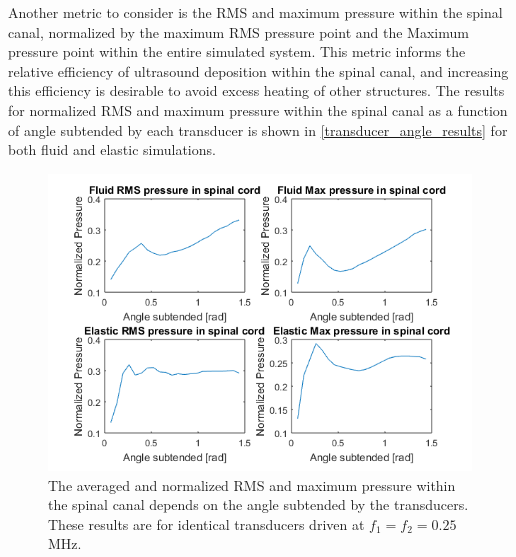 \documentclass[10pt,a4paper]{article}
\begin{document}
Another metric to consider is the RMS and maximum pressure within the spinal canal, normalized by the maximum RMS pressure point and the Maximum pressure point within the entire simulated system. This metric informs the relative efficiency of ultrasound deposition within the spinal canal, and increasing this efficiency is desirable to avoid excess heating of other structures. The results for normalized RMS and maximum pressure within the spinal canal as a function of angle subtended by each transducer is shown in \autoref{transducer_angle_results} for both fluid and elastic simulations.

\begin{figure}[H]
\includegraphics[scale=0.8]{transducer_angle_results}
\caption{The averaged and normalized RMS and maximum pressure within the spinal canal depends on the angle subtended by the transducers. These results are for identical transducers driven at $f_1 = f_2 = 0.25$MHz.} \label{transducer_angle_results}
\end{figure}
\end{document}
